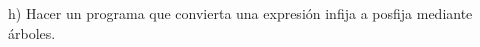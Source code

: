 {\color[rgb]{1,0,0}
h) Hacer un programa que convierta una expresión infija
a posfija mediante árboles.
}